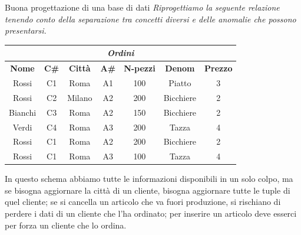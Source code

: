 \begin{Example}{Buona progettazione di una base di dati}{}
    \textit{Riprogettiamo la seguente relazione tenendo conto della separazione tra concetti diversi e delle anomalie che possono presentarsi.}
    \begin{center}
        \begin{tabular}{|c|c|c|c|c|c|c|}
            \hline\multicolumn{7}{|c|}{\textit{Ordini}}\\\hline
            \textbf{Nome} & \textbf{C\#} & \textbf{Città} & \textbf{A\#} & \textbf{N-pezzi} & \textbf{Denom} & \textbf{Prezzo}\\\hline
            Rossi & C1 & Roma & A1 & 100 & Piatto & 3\\
            Rossi & C2 & Milano & A2 & 200 & Bicchiere & 2\\
            Bianchi & C3 & Roma & A2 & 150 & Bicchiere & 2\\
            Verdi & C4 & Roma & A3 & 200 & Tazza & 4\\
            Rossi & C1 & Roma & A2 & 200 & Bicchiere & 2\\
            Rossi & C1 & Roma & A3 & 100 & Tazza & 4\\\hline
        \end{tabular}
    \end{center}
    In questo schema abbiamo tutte le informazioni disponibili in un solo colpo, ma se bisogna aggiornare la città di un cliente, bisogna aggiornare tutte le tuple di quel cliente; se si cancella un articolo che va fuori produzione, si rischiano di perdere i dati di un cliente che l'ha ordinato; per inserire un articolo deve esserci per forza un cliente che lo ordina. 
    

\end{Example}
